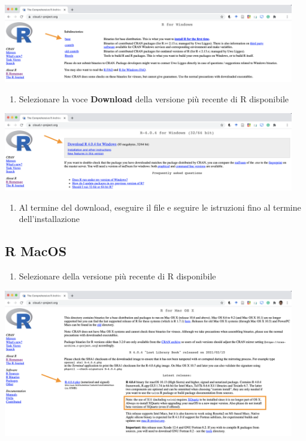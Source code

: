 \documentclass[
]{book}
\providecommand{\tightlist}{%
  \setlength{\itemsep}{0pt}\setlength{\parskip}{0pt}}
\begin{document}
\includegraphics[width=0.95\textwidth,height=\textheight]{images/install-Windows-base.png}

\begin{enumerate}
\def\labelenumi{\arabic{enumi}.}
\setcounter{enumi}{1}
\tightlist
\item
  Selezionare la voce \textbf{Download} della versione più recente di R disponibile
\end{enumerate}

\includegraphics[width=0.95\textwidth,height=\textheight]{images/install-Windows-version.png}

\begin{enumerate}
\def\labelenumi{\arabic{enumi}.}
\setcounter{enumi}{2}
\tightlist
\item
  Al termine del download, eseguire il file e seguire le istruzioni fino al termine dell'installazione
\end{enumerate}

\hypertarget{r-macos}{%
\subsection{R MacOS}\label{r-macos}}

\begin{enumerate}
\def\labelenumi{\arabic{enumi}.}
\tightlist
\item
  Selezionare della versione più recente di R disponibile
\end{enumerate}

\includegraphics[width=0.95\textwidth,height=\textheight]{images/install_Mac_version.png}
\end{document}
